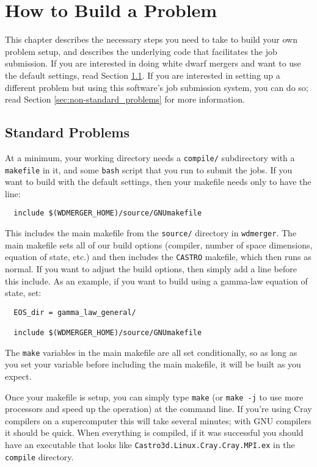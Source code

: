 \documentclass[12pt]{book}
\begin{document}
\chapter{How to Build a Problem}

This chapter describes the necessary steps you need to take to build your own problem setup,
and describes the underlying code that facilitates the job submission. If you are interested in
doing white dwarf mergers and want to use the default settings, read Section \ref{sec:standard_problems}.
If you are interested in setting up a different problem but using this software's job submission 
system, you can do so; read Section \ref{sec:non-standard_problems} for more information.

\section{Standard Problems}
\label{sec:standard_problems}

At a minimum, your working directory needs a \texttt{compile/} subdirectory with a \texttt{makefile}
in it, and some \texttt{bash} script that you run to submit the jobs. If you want to build 
with the default settings, then your makefile needs only to have the line:
\begin{lstlisting}
  include $(WDMERGER_HOME)/source/GNUmakefile
\end{lstlisting}%
This includes the main makefile from the \texttt{source/} directory in \texttt{wdmerger}. 
The main makefile sets all of our build options (compiler, number of space dimensions, 
equation of state, etc.) and then includes the \texttt{CASTRO} makefile, which then runs as normal.
If you want to adjust the build options, then simply add a line before this include. As an 
example, if you want to build using a gamma-law equation of state, set:
\begin{lstlisting}
  EOS_dir = gamma_law_general/

  include $(WDMERGER_HOME)/source/GNUmakefile 
\end{lstlisting}%

The \texttt{make} variables in the main makefile are all set conditionally, so as long 
as you set your variable before including the main makefile, it will be built as you expect.

Once your makefile is setup, you can simply type \texttt{make} (or \texttt{make -j} 
to use more processors and speed up the operation) at the command line. 
If you're using Cray compilers on a supercomputer this will take several minutes;
with GNU compilers it should be quick. When everything is compiled, if it was
successful you should have an executable that looks like \texttt{Castro3d.Linux.Cray.Cray.MPI.ex}
in the \texttt{compile} directory.
\end{document}
